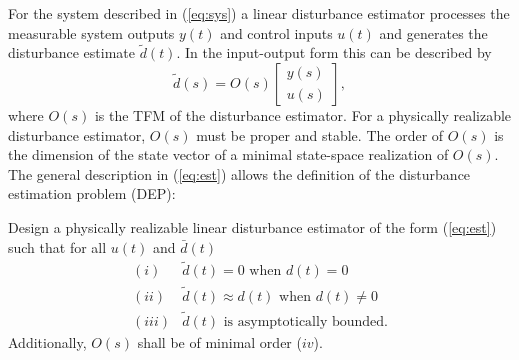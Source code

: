 \documentclass[graybox]{svmult}
\begin{document}
For the system described in (\ref{eq:sys}) a linear disturbance estimator processes the measurable system outputs $y(t)$ and control inputs $u(t)$ and generates the disturbance estimate $\tilde d(t)$. In the input-output form this can be described by
\begin{equation}\label{eq:est}
	\tilde d(s) = O(s)
	\begin{bmatrix}
		y(s) \\ u(s)
	\end{bmatrix},
\end{equation}
where $O(s)$ is the TFM of the disturbance estimator. For a physically realizable
disturbance estimator, $O(s)$ must be proper and stable. The order of $O(s)$ is the dimension of the state vector of a minimal state-space realization of $O(s)$. 
The general description in (\ref{eq:est}) allows the definition of the disturbance estimation problem (DEP):

Design a physically realizable linear disturbance estimator of the form (\ref{eq:est}) such that for all $u(t)$ and $\bar d(t)$ 
\begin{equation*}
	\begin{array}{ll}
		(i) & \tilde d(t) = 0 \text{ when } d(t) = 0 \\ 
		(ii) &\tilde d(t) \approx d(t) \text{ when } d(t) \neq 0 \\ 
		(iii) & \tilde d(t) \text{ is asymptotically bounded.}
	\end{array}
\end{equation*}
Additionally, $O(s)$ shall be of minimal order ($iv$). 
\end{document}
